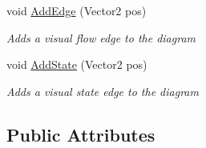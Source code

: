 \begin{DoxyCompactItemize}
void \hyperlink{class_model_view_controller_a1a31ef775ee8e6090e99e0e09dff4eab}{Add\+Edge} (Vector2 pos)
\begin{DoxyCompactList}\small\item\em Adds a visual flow edge to the diagram \end{DoxyCompactList}\item 
void \hyperlink{class_model_view_controller_a1a64c20a275603c8c8352e82cc4c87ec}{Add\+State} (Vector2 pos)
\begin{DoxyCompactList}\small\item\em Adds a visual state edge to the diagram \end{DoxyCompactList}\end{DoxyCompactItemize}
\subsection*{Public Attributes}
